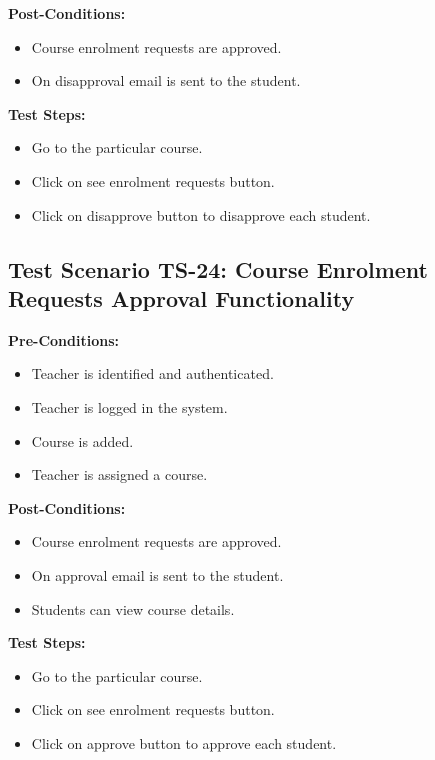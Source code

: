 \textbf{Post-Conditions: }
\begin{itemize}
\item Course enrolment requests are approved.
\item On disapproval email is sent to the student.

\end{itemize}
\textbf{Test Steps:}
\begin{itemize}

\item Go to the particular course.
\item Click on see enrolment requests button.
\item Click on disapprove button to disapprove each student.

\end{itemize}



\subsection{Test Scenario TS-24: Course Enrolment Requests Approval Functionality}
\textbf{Pre-Conditions: }
\begin{itemize}

\item Teacher is identified and authenticated.
\item Teacher is logged in the system.
\item Course is added.
\item Teacher is assigned a course.

\end{itemize}

\textbf{Post-Conditions: }
\begin{itemize}
\item Course enrolment requests are approved.
\item On approval email is sent to the student.
\item Students can view course details.


\end{itemize}
\textbf{Test Steps:}
\begin{itemize}

\item Go to the particular course.
\item Click on see enrolment requests button.
\item Click on approve button to approve each student.

\end{itemize}


